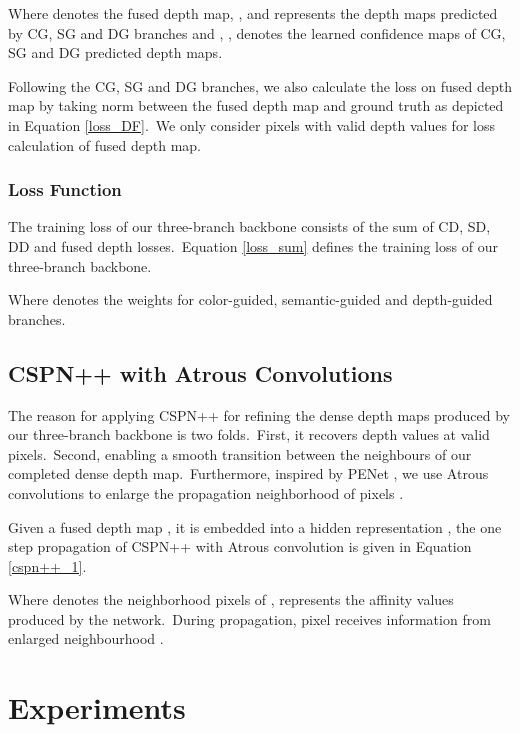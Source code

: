 \documentclass{ieeeaccess}
\begin{document}
Where  denotes the fused depth map, ,  and  represents the depth maps predicted by CG, SG and DG branches and , ,  denotes the learned confidence maps of CG, SG and DG predicted depth maps.

Following the CG, SG and DG branches, we also calculate the loss on fused depth map by taking  norm between the fused depth map and ground truth as depicted in Equation \ref{loss_DF}.~We only consider pixels with valid depth values for loss calculation of fused depth map. 


\subsubsection{Loss Function}
The training loss of our three-branch backbone consists of the sum of CD, SD, DD and fused depth losses.~Equation \ref{loss_sum} defines the training loss of our three-branch backbone.


Where  denotes the weights for color-guided, semantic-guided and depth-guided branches.




\subsection{CSPN++ with Atrous Convolutions}

The reason for applying CSPN++ for refining the dense depth maps produced by our three-branch backbone is two folds.~First, it recovers depth values at valid pixels.~Second, enabling a smooth transition between the neighbours of our completed dense depth map.~Furthermore, inspired by PENet \cite{hu2020PENet}, we use Atrous convolutions \cite{yu2016multiscale} to enlarge the propagation neighborhood of pixels \cite{xu2020deformable}.

Given a fused depth map , it is embedded into a hidden representation , the one step propagation of CSPN++ with Atrous convolution is given in Equation \ref{cspn++_1}.



Where  denotes the neighborhood pixels of ,  represents the affinity values produced by the network.~During propagation, pixel  receives information from enlarged neighbourhood . 


\section{Experiments}
\end{document}
